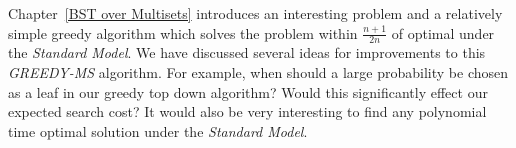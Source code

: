 \documentclass[letterpaper,12pt,titlepage,oneside,final]{book}
\theoremstyle{plain}
\let\origdoublepage\cleardoublepage
\newcommand{\clearemptydoublepage}{%
  \clearpage{\pagestyle{empty}\origdoublepage}}
\let\cleardoublepage\clearemptydoublepage
\begin{document}
Chapter~\ref{BST over Multisets} introduces an interesting problem and a relatively simple greedy algorithm which solves the problem within $\frac{n+1}{2n}$ of optimal under the \textit{Standard Model}. We have discussed several ideas for improvements to this \textit{GREEDY-MS} algorithm. For example, when should a large probability be chosen as a leaf in our greedy top down algorithm? Would this significantly effect our expected search cost? It would also be very interesting to find any polynomial time optimal solution under the \textit{Standard Model}.








\cleardoublepage %
\renewcommand*{\bibname}{References}




\nocite{*}
\end{document}
